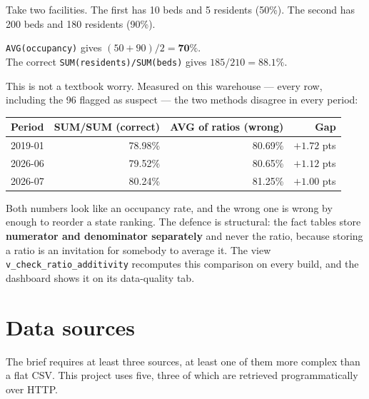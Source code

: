 \documentclass[11pt,a4paper]{article}
\newcommand{\sansall}{\sffamily}
\newcommand{\code}[1]{\texttt{#1}}
\begin{document}
\begin{badbox}[title={The most common mistake in warehouse work: averaging a ratio}]
Take two facilities. The first has 10 beds and 5 residents (50\%). The second
has 200 beds and 180 residents (90\%).

\vspace{0.25em}
\code{AVG(occupancy)} gives $(50+90)/2 = \mathbf{70\%}$. \\
The correct \code{SUM(residents)/SUM(beds)} gives $185/210 = \mathbf{88.1\%}$.

\vspace{0.25em}
This is not a textbook worry. Measured on this warehouse — every row, including
the 96 flagged as suspect — the two methods disagree in every period:

\vspace{0.35em}
\begin{tabular}{@{}lrrr@{}}
\toprule
\sansall\bfseries Period & \sansall\bfseries SUM/SUM (correct) &
\sansall\bfseries AVG of ratios (wrong) & \sansall\bfseries Gap \\
\midrule
2019-01 & 78.98\% & 80.69\% & $+1.72$ pts \\
2026-06 & 79.52\% & 80.65\% & $+1.12$ pts \\
2026-07 & 80.24\% & 81.25\% & $+1.00$ pts \\
\bottomrule
\end{tabular}

\vspace{0.35em}
Both numbers look like an occupancy rate, and the wrong one is wrong by enough
to reorder a state ranking. The defence is structural: the fact tables store
\textbf{numerator and denominator separately} and never the ratio, because
storing a ratio is an invitation for somebody to average it. The view
\code{v\_check\_ratio\_additivity} recomputes this comparison on every build,
and the dashboard shows it on its data-quality tab.
\end{badbox}

\section{Data sources}

The brief requires at least three sources, at least one of them more complex
than a flat CSV. This project uses five, three of which are retrieved
programmatically over HTTP.
\end{document}

